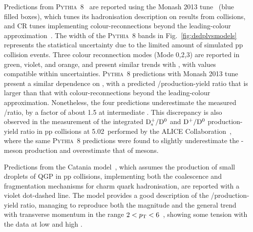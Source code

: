 Predictions from \textsc{Pythia}~8~\cite{Bierlich:2022pfr} are reported using the Monash 2013 tune~\cite{Skands:2014pea} (blue filled boxes), which tunes its hadronisation description on results from \ee collisions, and CR tunes implementing colour-reconnections beyond the leading-colour approximation~\cite{Christiansen:2015yqa}. The width of the \textsc{Pythia}~8 bands in Fig.~\ref{fig:dsdplvsmodels} represents the statistical uncertainty due to the limited amount of simulated pp collision events. Three colour reconnection modes (Mode 0,2,3) are reported in green, violet, and orange, and present similar trends with \pt, with values compatible within uncertainties. \textsc{Pythia}~8 predictions with Monash 2013 tune present a similar dependence on \pt, with a predicted \ds/\dpl production-yield ratio that is larger than that with colour-reconnections beyond the leading-colour approximation. Nonetheless, the four predictions underestimate the measured \ds/\dpl ratio, by a factor of about 1.5 at intermediate \pt. This discrepancy is also observed in the measurement of the \pt integrated $\mathrm{D_s^+}/\mathrm{D^0}$ and $\mathrm{D^+}/\mathrm{D^0}$ production-yield ratio in pp collisions at 5.02~\tev performed by the ALICE Collaboration~\cite{ALICE:2021dhb}, where the same \textsc{Pythia}~8 predictions were found to slightly underestimate the \ds-meson production and overestimate that of \dpl mesons.

Predictions from the Catania model~\cite{Minissale:2020bif}, which assumes the production of small droplets of QGP in pp collisions, implementing both the coalescence and fragmentation mechanisms for charm quark hadronisation, are reported with a violet dot-dashed line. The model provides a good description of the \ds/\dpl production-yield ratio, managing to reproduce both the magnitude and the general trend with transverse momentum in the range $2<p_\mathrm{T}<6$~\gevc, showing some tension with the data at low and high \pt. 

